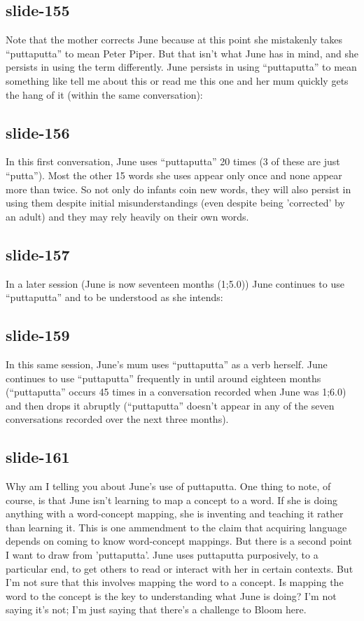 \documentclass[12pt,\papersize]{extarticle}
\begin{document}
 
\subsection{slide-155}
Note that the mother corrects June because at this point she mistakenly takes “puttaputta” to mean Peter Piper.
But that isn't what June has in mind, and she persists in using the term differently.
June persists in using “puttaputta” to mean something like tell me about this or read me this one and her mum quickly gets the hang of it (within the same conversation):
 
 
\subsection{slide-156}
In this first conversation, June uses “puttaputta” 20 times (3 of these are just “putta”). Most the other 15 words she uses appear only once and none appear more than twice.
So not only do infants coin new words, they will also persist in using them despite initial misunderstandings (even despite being 'corrected' by an adult) and they may rely heavily on their own words.
 
 
\subsection{slide-157}
In a later session (June is now seventeen months (1;5.0)) June continues to use “puttaputta” and to be understood as she intends:
 
 
\subsection{slide-159}
In this same session, June's mum uses “puttaputta” as a verb herself.
June continues to use “puttaputta” frequently in until around eighteen months (“puttaputta” occurs 45 times in a conversation recorded when June was 1;6.0) and then drops it abruptly (“puttaputta” doesn't appear in any of the seven conversations recorded over the next three months).
 
 
\subsection{slide-161}
Why am I telling you about June's use of puttaputta.
One thing to note, of course, is that June isn't learning to map a concept to a word.
If she is doing anything with a word-concept mapping, she is inventing and teaching it rather than learning it.
This is one ammendment to the claim that acquiring language depends on coming to know word-concept mappings.
But there is a second point I want to draw from 'puttaputta'.
June uses puttaputta purposively, to a particular end, to get others to read or interact with her in certain contexts.
But I'm not sure that this involves mapping the word to a concept.
Is mapping the word to the concept is the key to understanding what June is doing?
I'm not saying it's not; I'm just saying that there's a challenge to Bloom here.
 
\end{document}
